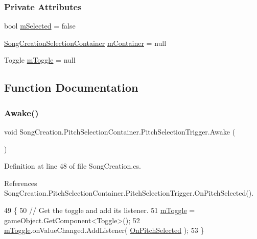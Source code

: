 \subsubsection*{Private Attributes}
\begin{DoxyCompactItemize}
\item 
bool \hyperlink{group___s_c_handlers_ga49ffd4516ec7982b1683a44b4f22de74}{m\+Selected} = false
\item 
\hyperlink{class_song_creation_1_1_song_creation_selection_container}{Song\+Creation\+Selection\+Container} \hyperlink{group___s_c_handlers_ga23a094f17b949a4ea153f66c73e42578}{m\+Container} = null
\item 
Toggle \hyperlink{group___s_c_handlers_gaffc6248c907c4357b0a0a30b86635f3a}{m\+Toggle} = null
\end{DoxyCompactItemize}


\subsection{Function Documentation}
\mbox{\label{group___s_c_handlers_gae07e3c0a5aa45a8b064abb9cea88c1d6}} 
\subsubsection{\texorpdfstring{Awake()}{Awake()}\hspace{0.1cm}{\footnotesize\ttfamily [1/3]}}
{\footnotesize\ttfamily void Song\+Creation.\+Pitch\+Selection\+Container.\+Pitch\+Selection\+Trigger.\+Awake (\begin{DoxyParamCaption}{ }\end{DoxyParamCaption})\hspace{0.3cm}{\ttfamily [private]}}



Definition at line 48 of file Song\+Creation.\+cs.



References Song\+Creation.\+Pitch\+Selection\+Container.\+Pitch\+Selection\+Trigger.\+On\+Pitch\+Selected().


\begin{DoxyCode}
49             \{
50                 \textcolor{comment}{// Get the toggle and add its listener.}
51                 \hyperlink{group___s_c_handlers_gaa289269d96356379b79d3918535561fd}{mToggle} = gameObject.GetComponent<Toggle>();
52                 \hyperlink{group___s_c_handlers_gaa289269d96356379b79d3918535561fd}{mToggle}.onValueChanged.AddListener( \hyperlink{group___s_c_handlers_gac113e02950a228fc6c78ad5972238a98}{OnPitchSelected} );
53             \}
\end{DoxyCode}
\mbox{\label{group___s_c_handlers_ga1d7d3017d7cc312657926de99f04d73c}} 
